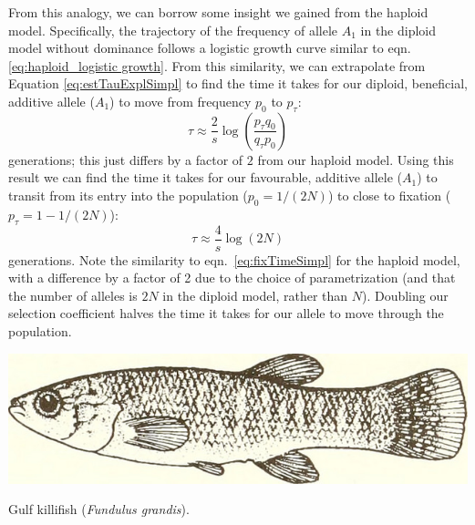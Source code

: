 From this analogy, we can borrow some insight we gained from the
haploid model. Specifically, the trajectory of the frequency of allele
$A_1$ in the diploid model without dominance follows a logistic growth
curve similar to eqn. \eqref{eq:haploid_logistic growth}. From this similarity, we can extrapolate from Equation \eqref{eq:estTauExplSimpl} to find the time it takes for our diploid, beneficial, additive allele ($A_1$) to move from frequency $p_0$ to $p_{\tau}$:
\begin{equation}
	\tau \approx \frac{2}{s} \log \left(\frac{p_{\tau} q_0}{q_{\tau} p_0}\right)
\end{equation}
generations; this just differs by a factor of $2$ from our haploid model. Using this result we can find the time it takes for our favourable, additive allele ($A_1$) to transit from its entry into the population ($p_0 =1/(2N)$)
to close to fixation ($p_{\tau} =1-1/(2N)$):
\begin{equation}
	\tau \approx \frac{4}{s} \log(2N)  \label{eq:diploid_fix_time}
\end{equation}
generations. Note the similarity to eqn.\ \ref{eq:fixTimeSimpl} for the haploid model, with a difference
by a factor of 2 due to the choice of parametrization 
(and that the number of alleles is $2N$ in the diploid model, rather than $N$). Doubling our selection coefficient halves the time it takes for our allele to move through the population.\\


\begin{marginfigure}
\begin{center}
  \includegraphics[width = \textwidth]{illustration_images/single_locus_selection/killifish/20974603315_1f9775189e_z.jpg}
\end{center}
\caption{Gulf killifish ({\it Fundulus grandis}).  } \label{fig:killifish}
\end{marginfigure}

